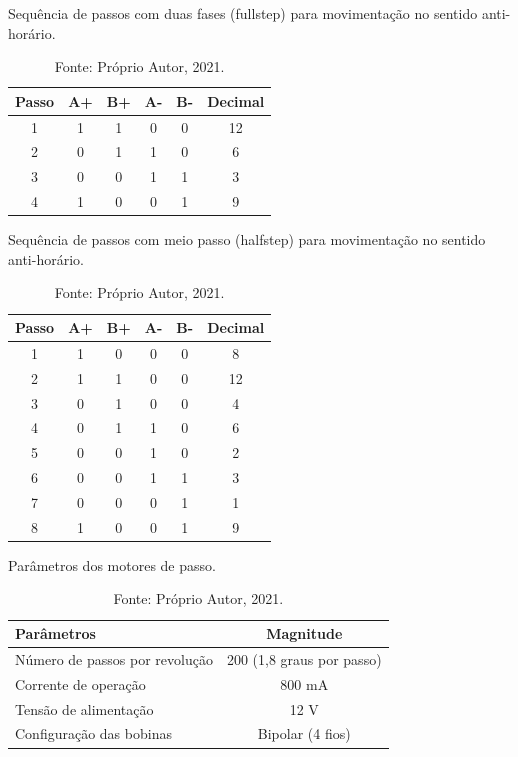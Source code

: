 \begin{table}
    \centering
    \caption{Sequência de passos com duas fases (fullstep) para movimentação no sentido anti-horário.}
    \begin{tabular}{cccccc}
        \hline
        \textbf{Passo} & \textbf{A+} & \textbf{B+} & \textbf{A-} & \textbf{B-} & \textbf{Decimal}\\
        \hline
        1 & 1 & 1 & 0 & 0 & 12\\
        2 & 0 & 1 & 1 & 0 & 6\\
        3 & 0 & 0 & 1 & 1 & 3\\
        4 & 1 & 0 & 0 & 1 & 9\\
        \hline       
    \end{tabular}
    \caption*{Fonte: Próprio Autor, 2021.}
    \label{tab:fullstepantihorario}
\end{table}

\begin{table}
    \centering
    \caption{Sequência de passos com meio passo (halfstep) para movimentação no sentido anti-horário.}
    \begin{tabular}{cccccc}
        \hline
        \textbf{Passo} & \textbf{A+} & \textbf{B+} & \textbf{A-} & \textbf{B-} & \textbf{Decimal}\\
        \hline
        1 & 1 & 0 & 0 & 0 & 8\\
        2 & 1 & 1 & 0 & 0 & 12\\
        3 & 0 & 1 & 0 & 0 & 4\\
        4 & 0 & 1 & 1 & 0 & 6\\
        5 & 0 & 0 & 1 & 0 & 2\\
        6 & 0 & 0 & 1 & 1 & 3\\
        7 & 0 & 0 & 0 & 1 & 1\\
        8 & 1 & 0 & 0 & 1 & 9\\
        \hline       
    \end{tabular}
    \caption*{Fonte: Próprio Autor, 2021.}
    \label{tab:halfstepantihorario}
\end{table}


\begin{table}
    \centering
    \caption{Parâmetros dos motores de passo.}
    \begin{tabular}{lc}
        \hline
        \textbf{Parâmetros} & \textbf{Magnitude}\\
        \hline
        Número de passos por revolução & 200 (1,8 graus por passo)\\
        Corrente de operação & 800 mA\\
        Tensão de alimentação & 12 V\\
        Configuração das bobinas & Bipolar (4 fios)\\
        \hline       
    \end{tabular}
    \caption*{Fonte: Próprio Autor, 2021.}
    \label{tab:pmotordepasso}
\end{table}

